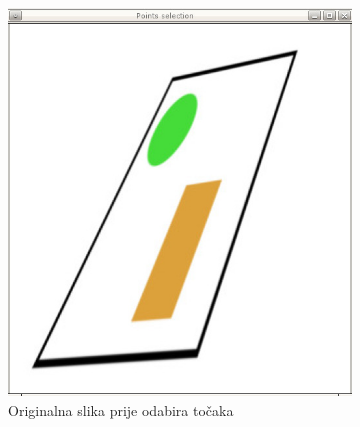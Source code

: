 \begin{figure}[ht]
\centering

\begin{subfigure}{0.45\textwidth}
\begin{minipage}{0.9\textwidth}
	\centering
	\includegraphics[width=\textwidth]{figures/points_selection.jpg}
	\caption[margin=1cm]{Originalna slika prije odabira točaka}
	\label{fig:odabirTocaka1}
\end{minipage}
\end{subfigure}%
\begin{subfigure}{0.45\textwidth}
\begin{minipage}{0.9\textwidth}
	\centering

\end{minipage}
\end{subfigure}
\end{figure}
